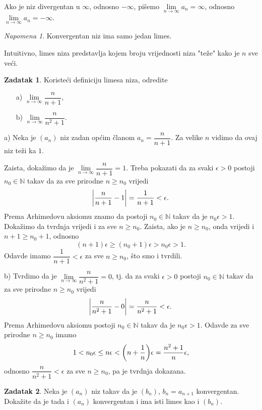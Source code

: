 \documentclass{book}
\let\originalleft\left
\let\originalright\right
\renewcommand{\left}{\mathopen{}\mathclose\bgroup\originalleft}
\renewcommand{\right}{\aftergroup\egroup\originalright}
\renewenvironment{proof}{%
    \vspace{-\parskip}\begin{oldproof}%
    }{%
    \end{oldproof}%
}
\theoremstyle{definition}
\theoremstyle{definition}
\newtheorem{exercise}{Zadatak}
\theoremstyle{remark}
\newtheorem{remark}{Napomena}
\begin{document}
Ako je niz divergentan u $\mathbb{\infty}$, odnosno $-\mathbb{\infty}$, pišemo $\lim\limits_{n\to \infty}{a_n}=\infty$, odnosno $\lim\limits_{n\to \infty}{a_n}=-\infty$.
\begin{remark}
Konvergentan niz ima samo jedan limes.
\end{remark}

Intuitivno, limes niza predstavlja kojem broju vrijednosti niza "teže" kako je $n$ sve veći.

\begin{exercise}
Koristeći definiciju limesa niza, odredite
\begin{itemize}
\item[a)] $\lim\limits_{n\to \infty}{\dfrac{n}{n+1}}$,
\item[b)] $\lim\limits_{n\to \infty}{\dfrac{n}{n^2+1}}$.
\end{itemize}
\end{exercise}
\begin{proof}[Rješenje]
a) Neka je $(a_n)$ niz zadan općim članom $a_n=\dfrac{n}{n+1}$. Za velike $n$ vidimo da ovaj niz teži ka $1$. 

Zaista, dokažimo da je $\lim\limits_{n\to \infty}{\dfrac{n}{n+1}}=1$. Treba pokazati da za svaki $\epsilon>0$ postoji $n_0\in \mathbb{N}$ takav da za sve prirodne $n\geq n_0$ vrijedi
$$\abs{\dfrac{n}{n+1}-1}=\dfrac{1}{n+1}<\epsilon.$$ Prema Arhimedovu aksiomu znamo da postoji $n_0\in \mathbb{N}$ takav da je $n_0\epsilon>1$. Dokažimo da tvrdnja vrijedi i za sve $n\geq n_0$. Zaista, ako je $n\geq n_0$, onda vrijedi i $n+1\geq n_0+1$, odnosno $$(n+1)\epsilon\geq(n_0+1)\epsilon>n_0\epsilon>1.$$ 
Odavde imamo $\dfrac{1}{n+1}<\epsilon$ za sve $n\geq n_0$, što smo i tvrdili.

b) Tvrdimo da je $\lim\limits_{n\to \infty}{\dfrac{n}{n^2+1}}=0$, tj. da za svaki $\epsilon>0$ postoji $n_0\in \mathbb{N}$ takav da za sve prirodne $n\geq n_0$ vrijedi
$$\abs{\dfrac{n}{n^2+1}-0}=\dfrac{n}{n^2+1}<\epsilon.$$
Prema Arhimedovu aksiomu postoji $n_0\in \mathbb{N}$ takav da je $n_0\epsilon>1$. Odavde za sve prirodne $n\geq n_0$ imamo
$$1<n_0\epsilon\leq n\epsilon<\left(n+\dfrac{1}{n}\right)\epsilon=\dfrac{n^2+1}{n}\epsilon,$$
odnosno $\dfrac{n}{n^2+1}<\epsilon$ za sve $n\geq n_0$, pa je tvrdnja dokazana.
\end{proof}
\begin{exercise}
\label{41}
Neka je $(a_n)$ niz takav da je $(b_n)$, $b_n=a_{n+1}$ konvergentan. Dokažite da je tada i $(a_n)$ konvergentan i ima isti limes kao i $(b_n)$.
\end{exercise}
\end{document}
